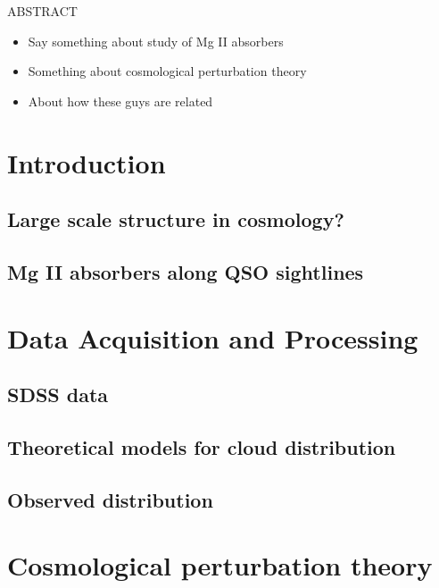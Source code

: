\documentclass[12pt,a4paper,oneside]{book}
\begin{document}

\newpage\topskip 40pt
\thispagestyle{empty}
\centerline{\Large ABSTRACT}
\vskip 20pt\noindent 
\begin{itemize}
	\item Say something about study of Mg II absorbers
	\item Something about cosmological perturbation theory
	\item About how these guys are related
\end{itemize}


\newpage
\thispagestyle{empty}
\tableofcontents
\newpage




\chapter{Introduction}
	\section{Large scale structure in cosmology?}
	\section{Mg II absorbers along QSO sightlines}
\chapter{Data Acquisition and Processing}
	\section{SDSS data}
	\section{Theoretical models for cloud distribution}
	\section{Observed distribution}
\chapter{Cosmological perturbation theory}
\end{document}
